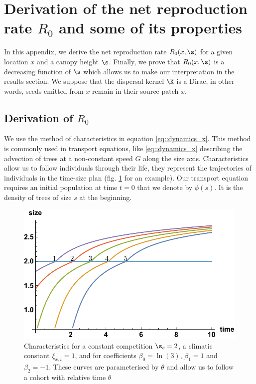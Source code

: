 \section{Derivation of the net reproduction rate $ R_0 $ and some of its properties} \label{app::calc_R0}
\begin{refsection}
In this appendix, we derive the net reproduction rate $ R_0(x, \s) $ for a given location $ x $ and a canopy height $ \s $. Finally, we prove that $ R_0(x, \s) $ is a decreasing function of $ \s $ which allows us to make our interpretation in the results section. We suppose that the dispersal kernel $ \K $ is a Dirac, in other words, seeds emitted from $ x $ remain in their source patch $ x $.

\subsection{Derivation of $ R_0 $ \label{calc_R0::sec::R0}}
We use the method of characteristics in equation \eqref{eq::dynamics_x}. This method is commonly used in transport equations, like \eqref{eq::dynamics_x} describing the advection of trees at a non-constant speed  $ G $ along the size axis. Characteristics allow us to follow individuals through their life, \ie they represent the trajectories of individuals in the time-size plan (fig. \ref{fig::chara} for an example). Our transport equation requires an initial population at time $ t = 0 $ that we denote by $ \phi(s) $. It is the density of trees of size $ s $ at the beginning.

\begin{figure}[h!]
	\includegraphics{illustrations/chara}
	\caption{Characteristics for a constant competition $ \s_c = 2 $, a climatic constant $ \xi_{x, i} = 1 $, and for coefficients $ \beta_0 = \ln(3) $, $ \beta_1 = 1 $ and $ \beta_2 = -1 $. These curves are parameterised by $ \theta $ and allow us to follow a cohort with relative time $ \theta $}
	\label{fig::chara}
\end{figure}


\end{refsection}
